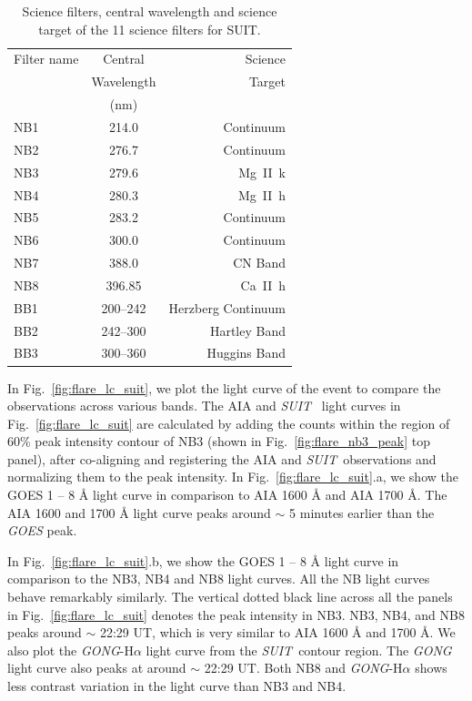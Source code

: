\documentclass[12pt]{article}
\newcommand{\suit}{{\it{SUIT}}}
\begin{document}
\begin{table}
\centering
\begin{tabular}{lcr}
\hline
Filter name 	& Central 		    		 & Science\\
		& Wavelength	    	&         Target\\
		& (nm)			    	&          \\
\hline
NB1 		& 214.0                 			&Continuum\\
NB2 		& 276.7 		       			&Continuum\\
NB3 		& 279.6 			   			&Mg~\rm{II}~k\\
NB4 		& 280.3 			   			&Mg~\rm{II}~h\\
NB5 		& 283.2 			   			&Continuum\\
NB6 		& 300.0   			   			&Continuum\\
NB7 		& 388.0   			   			&CN Band\\ 
NB8 		& 396.85 			  				&Ca~\rm{II}~h\\
BB1 		& 200{--}242 		   			&Herzberg Continuum\\
BB2 		& 242{--}300 		   			&Hartley Band\\
BB3 		& 300{--}360 		   			&Huggins Band\\
\hline
\end{tabular}
\caption{Science filters, central wavelength and science target of the 11 science filters for SUIT.} 
\label{sc_comb_fil}
\end{table}

In Fig.~\ref{fig:flare_lc_suit}, we plot the light curve of the event to compare the observations across various bands. The AIA and \suit~ light curves in Fig.~\ref{fig:flare_lc_suit} are calculated by adding the counts within the region of 60\% peak intensity contour of NB3 (shown in Fig.~\ref{fig:flare_nb3_peak} top panel), after co-aligning and registering the AIA and \suit~observations and normalizing them to the peak intensity. In Fig.~\ref{fig:flare_lc_suit}.a, we show the GOES 1 {--} 8 {\AA} light curve in comparison to AIA 1600 {\AA} and AIA 1700 {\AA}. The AIA 1600 and 1700 {\AA} light curve peaks around $\sim$ 5 minutes earlier than the {\it GOES} peak. 

In Fig.~\ref{fig:flare_lc_suit}.b, we show the GOES 1 {--} 8 {\AA} light curve in comparison to the NB3, NB4 and NB8 light curves. All the NB light curves behave remarkably similarly. The vertical dotted black line across all the panels in Fig.~\ref{fig:flare_lc_suit} denotes the peak intensity in NB3. NB3, NB4, and NB8 peaks around $\sim$ 22:29 UT, which is very similar to AIA 1600 {\AA} and 1700 {\AA}. We also plot the {\it GONG}-H$\alpha$ light curve from the \suit~contour region. The {\it GONG} light curve also peaks at around $\sim$ 22:29 UT. Both NB8 and {\it GONG}-H$\alpha$ shows less contrast variation in the light curve than NB3 and NB4.
\end{document}

